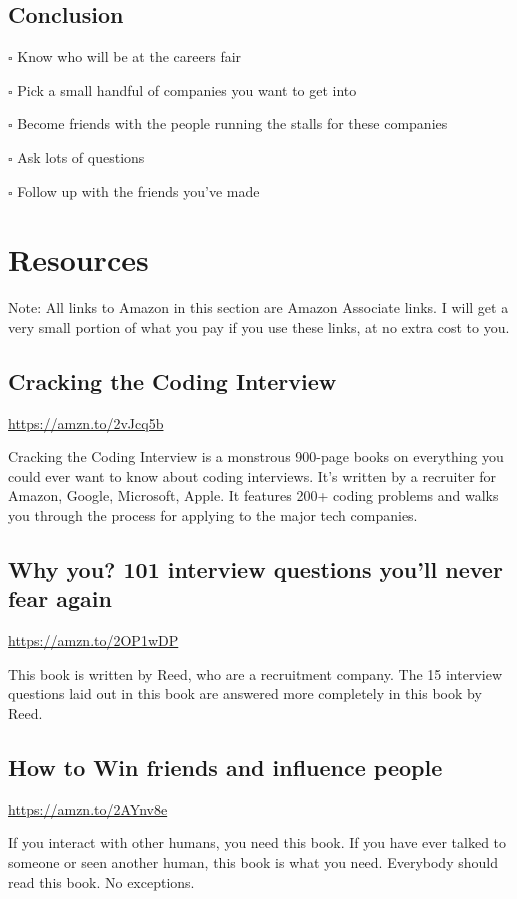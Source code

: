 \documentclass{article}
\begin{document}
\subsection{Conclusion}
$\square$ Know who will be at the careers fair

$\square$ Pick a small handful of companies you want to get into

$\square$ Become friends with the people running the stalls for these companies

$\square$ Ask lots of questions

$\square$ Follow up with the friends you've made
\section{Resources}
Note: All links to Amazon in this section are Amazon Associate links. I
will get a very small portion of what you pay if you use these links, at
no extra cost to you.

\hypertarget{cracking-the-coding-interview}{%
\subsection{Cracking the Coding Interview
}\label{cracking-the-coding-interview}}

\href{https://amzn.to/2vJcq5b}{{https://amzn.to/2vJcq5b}}

Cracking the Coding Interview is a monstrous 900-page books on
everything you could ever want to know about coding interviews. It's
written by a recruiter for Amazon, Google, Microsoft, Apple. It features
200+ coding problems and walks you through the process for applying to
the major tech companies.

\hypertarget{why-you-101-interview-questions-youll-never-fear-again}{%
\subsection{Why you? 101 interview questions you'll never fear
again}\label{why-you-101-interview-questions-youll-never-fear-again}}

\href{https://amzn.to/2OP1wDP}{{https://amzn.to/2OP1wDP}}

This book is written by Reed, who are a recruitment company. The 15
interview questions laid out in this book are answered more completely
in this book by Reed.

\hypertarget{how-to-win-friends-and-influence-people}{%
\subsection{How to Win friends and influence
people}\label{how-to-win-friends-and-influence-people}}

\href{https://amzn.to/2AYnv8e}{{https://amzn.to/2AYnv8e}}

If you interact with other humans, you need this book. If you have ever
talked to someone or seen another human, this book is what you need.
Everybody should read this book. No exceptions.
\end{document}
